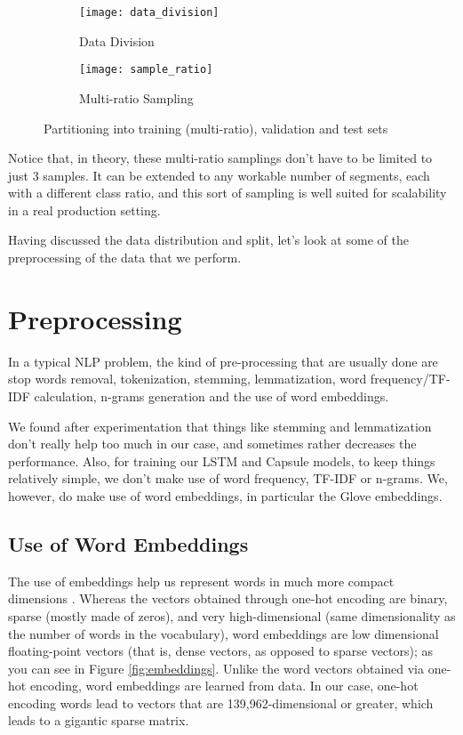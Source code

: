 \documentclass[11pt,twocolumn,letterpaper]{article}
\begin{document}
\begin{figure*}[h]
     \centering
     \begin{subfigure}[b]{\textwidth}
         \centering
         \texttt{[image: data\_division]}
         \caption{Data Division}
         \label{fig:y equals x}
     \end{subfigure}
     \vfill
     \begin{subfigure}[b]{\textwidth}
         \centering
         \texttt{[image: sample\_ratio]}
         \caption{Multi-ratio Sampling}
         \label{fig:three sin x}
     \end{subfigure}
        \caption{Partitioning into training (multi-ratio), validation and test sets}
        \label{fig:partition}
\end{figure*} 

Notice that, in theory, these multi-ratio samplings don't have to be limited to just 3 samples. It can be extended to any workable number of segments, each with a different class ratio, and this sort of sampling is well suited for scalability in a real production setting.

Having discussed the data distribution and split, let's look at some of the preprocessing of the data that we perform.

\section{Preprocessing}
In a typical NLP problem, the kind of pre-processing that are usually done are stop words removal, tokenization, stemming, lemmatization, word frequency/TF-IDF calculation, n-grams generation and the use of word embeddings.

We found after experimentation that things like stemming and lemmatization don't really help too much in our case, and sometimes rather decreases the performance. Also, for training our LSTM and Capsule models, to keep things relatively simple, we don't make use of word frequency, TF-IDF or n-grams. We, however, do make use of word embeddings, in particular the Glove \cite{glove} embeddings.  

\subsection{Use of Word Embeddings}
The use of embeddings help us represent words in much more compact dimensions \cite{dl1}. Whereas the vectors obtained through one-hot encoding are binary, sparse (mostly made of zeros), and very high-dimensional (same
dimensionality as the number of words in the vocabulary), word embeddings are low dimensional floating-point vectors (that is, dense vectors, as opposed to sparse vectors); as you can see in Figure \ref{fig:embeddings}. Unlike the word vectors obtained via one-hot encoding, word embeddings are learned from data. In our case, one-hot encoding words lead to vectors that are 139,962-dimensional or greater, which leads to a gigantic sparse matrix. 
\end{document}
